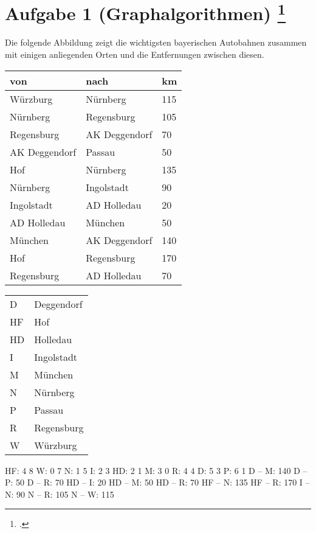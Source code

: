 \documentclass{lehramt-informatik-aufgabe}
\begin{document}
\def\p{ $\rightarrow$ }

\section{Aufgabe 1 (Graphalgorithmen)
\footcite{66115:2017:03}}

Die folgende Abbildung zeigt die wichtigsten bayerischen Autobahnen
zusammen mit einigen anliegenden Orten und die Entfernungen zwischen
diesen.


\begin{tabular}{l|l|l}
von           & nach          & km\\\hline\hline
Würzburg      & Nürnberg      & 115\\
Nürnberg      & Regensburg    & 105\\
Regensburg    & AK Deggendorf & 70\\
AK Deggendorf & Passau        & 50\\\hline
Hof           & Nürnberg      & 135\\
Nürnberg      & Ingolstadt    & 90\\
Ingolstadt    & AD Holledau   & 20\\
AD Holledau   & München       & 50\\\hline
München       & AK Deggendorf & 140\\\hline
Hof           & Regensburg    & 170\\
Regensburg    & AD Holledau   & 70\\
\end{tabular}


\begin{tabular}{ll}
D  & Deggendorf\\
HF & Hof\\
HD & Holledau\\
I  & Ingolstadt\\
M  & München\\
N  & Nürnberg\\
P  & Passau\\
R  & Regensburg\\
W  & Würzburg\\
\end{tabular}

\begin{liGraphenFormat}
HF: 4 8
W: 0 7
N: 1 5
I: 2 3
HD: 2 1
M: 3 0
R: 4 4
D: 5 3
P: 6 1
D -- M: 140
D -- P: 50
D -- R: 70
HD -- I: 20
HD -- M: 50
HD -- R: 70
HF -- N: 135
HF -- R: 170
I -- N: 90
N -- R: 105
N -- W: 115
\end{liGraphenFormat}
\end{document}
